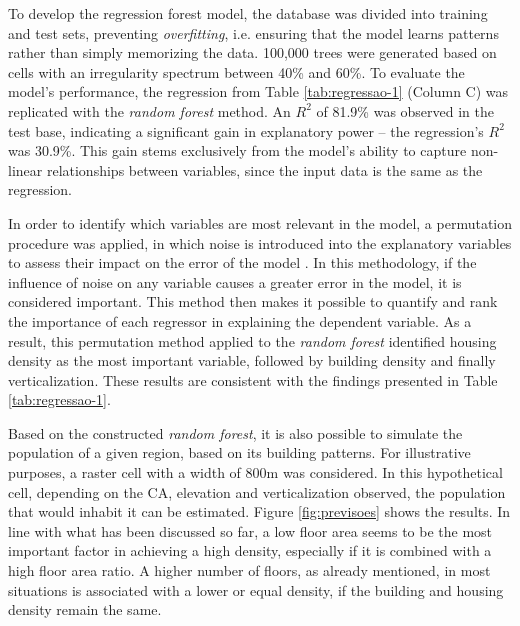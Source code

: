 To develop the regression forest model, the database was divided into training and test sets, preventing \textit{overfitting}, i.e. ensuring that the model learns patterns rather than simply memorizing the data. 100,000 trees were generated based on cells with an irregularity spectrum between 40\% and 60\%. To evaluate the model's performance, the regression from Table \ref{tab:regressao-1} (Column C) was replicated with the \textit{random forest} method. An $R^2$ of 81.9\% was observed in the test base, indicating a significant gain in explanatory power -- the regression's $R^2$ was 30.9\%. This gain stems exclusively from the model's ability to capture non-linear relationships between variables, since the input data is the same as the regression.

In order to identify which variables are most relevant in the model, a permutation procedure was applied, in which noise is introduced into the explanatory variables to assess their impact on the error of the model \cite{breiman2001random, Nembrini2018}. In this methodology, if the influence of noise on any variable causes a greater error in the model, it is considered important. This method then makes it possible to quantify and rank the importance of each regressor in explaining the dependent variable. As a result, this permutation method applied to the \textit{random forest} identified housing density as the most important variable, followed by building density and finally verticalization. These results are consistent with the findings presented in Table \ref{tab:regressao-1}.

Based on the constructed \textit{random forest}, it is also possible to simulate the population of a given region, based on its building patterns. For illustrative purposes, a raster cell with a width of 800m was considered. In this hypothetical cell, depending on the CA, elevation and verticalization observed, the population that would inhabit it can be estimated. Figure \ref{fig:previsoes} shows the results. In line with what has been discussed so far, a low floor area seems to be the most important factor in achieving a high density, especially if it is combined with a high floor area ratio. A higher number of floors, as already mentioned, in most situations is associated with a lower or equal density, if the building and housing density remain the same.

